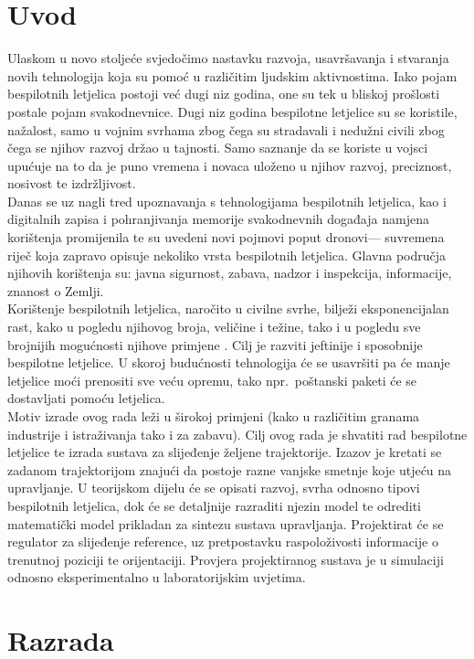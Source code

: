 \documentclass[times, utf8, diplomski]{fer}
\begin{document}
\chapter{Uvod}
Ulaskom u novo stoljeće svjedočimo nastavku razvoja, usavršavanja i stvaranja novih tehnologija koja su pomoć u različitim ljudskim aktivnostima. Iako pojam bespilotnih letjelica postoji već dugi niz godina, one su tek u bliskoj prošlosti postale pojam svakodnevnice. Dugi niz godina bespilotne letjelice su se koristile, nažalost, samo u vojnim svrhama zbog čega su stradavali i nedužni civili zbog čega se njihov razvoj držao u tajnosti. Samo saznanje da se koriste u vojsci upućuje na to da je puno vremena i novaca uloženo u njihov razvoj, preciznost, nosivost te izdržljivost.\\
Danas se uz nagli tred upoznavanja s tehnologijama bespilotnih letjelica, kao i digitalnih zapisa i pohranjivanja memorije svakodnevnih događaja namjena korištenja promijenila te su uvedeni novi pojmovi poput \glqq dronovi\grqq --- suvremena riječ koja zapravo opisuje nekoliko vrsta bespilotnih letjelica. Glavna područja njihovih korištenja su: javna sigurnost, zabava, nadzor i inspekcija, informacije, znanost o Zemlji.\\
Korištenje  bespilotnih letjelica, naročito u civilne svrhe, bilježi eksponencijalan rast, kako u pogledu njihovog broja, veličine i težine, tako i u pogledu sve brojnijih mogućnosti njihove primjene \citep{EUR-Lex}. Cilj je razviti jeftinije i sposobnije bespilotne letjelice. U skoroj budućnosti tehnologija će se usavršiti pa će manje letjelice moći prenositi sve veću opremu, tako npr.~poštanski paketi će se dostavljati pomoću letjelica.\\
Motiv izrade ovog rada leži u širokoj primjeni (kako u različitim granama industrije i istraživanja tako i za zabavu). Cilj ovog rada je shvatiti rad bespilotne letjelice te izrada sustava za slijeđenje željene trajektorije. Izazov je kretati se zadanom trajektorijom znajući da postoje razne vanjske smetnje koje utjeću na upravljanje. U teorijskom dijelu će se opisati razvoj, svrha odnosno tipovi bespilotnih letjelica, dok će se detaljnije razraditi njezin model te odrediti matematički model prikladan za sintezu sustava upravljanja. Projektirat će se regulator za slijeđenje reference, uz pretpostavku raspoloživosti informacije o trenutnoj poziciji te orijentaciji. Provjera projektiranog sustava je u simulaciji odnosno eksperimentalno u laboratorijskim uvjetima.

\chapter{Razrada}
\end{document}
